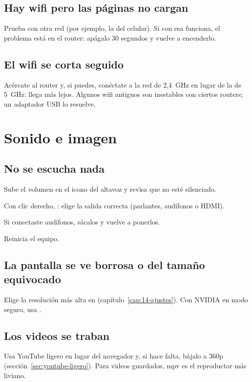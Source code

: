 \subsection{Hay wifi pero las páginas no cargan}
Prueba con otra red (por ejemplo, la del celular). Si con esa funciona, el
problema está en el router: apágalo 30 segundos y vuelve a encenderlo.

\subsection{El wifi se corta seguido}
Acércate al router y, si puedes, conéctate a la red de 2,4~GHz en lugar de
la de 5~GHz: llega más lejos. Algunos wifi antiguos son inestables con
ciertos routers; un adaptador USB lo resuelve.

\section{Sonido e imagen}

\subsection{No se escucha nada}\label{sec:prob-sonido}
\begin{pasos}
  \item Sube el volumen en el icono del altavoz y revisa que no esté
        silenciado.
  \item Con clic derecho, : elige la salida
        correcta (parlantes, audífonos o HDMI).
  \item Si conectaste audífonos, sácalos y vuelve a ponerlos.
  \item Reinicia el equipo.
\end{pasos}

\subsection{La pantalla se ve borrosa o del tamaño equivocado}
Elige la resolución más alta en 
(capítulo~\ref{cap:14-ajustes}). Con NVIDIA en modo seguro, usa
.

\subsection{Los videos se traban}
Usa YouTube ligero en lugar del navegador y, si hace falta, bájalo a 360p
(sección~\ref{sec:youtube-ligero}). Para videos guardados, mpv es el
reproductor más liviano.

